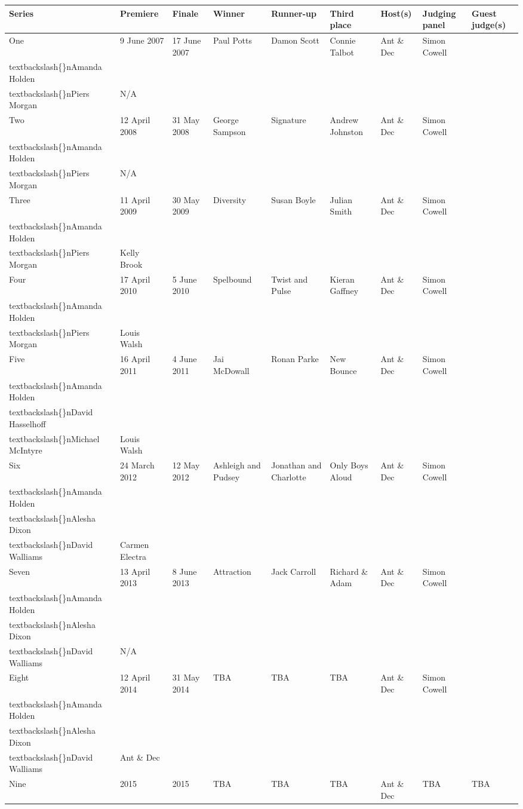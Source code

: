 \documentclass{article}
\begin{document}
\begin{tabular}{lllllllll}
\toprule
Series & Premiere & Finale & Winner & Runner-up & Third place & Host(s) & Judging panel & Guest judge(s) \\
\midrule
One & 9 June 2007 & 17 June 2007 & Paul Potts & Damon Scott & Connie Talbot & Ant \& Dec & Simon Cowell\\textbackslash\{\}nAmanda Holden\\textbackslash\{\}nPiers Morgan & N/A \\
Two & 12 April 2008 & 31 May 2008 & George Sampson & Signature & Andrew Johnston & Ant \& Dec & Simon Cowell\\textbackslash\{\}nAmanda Holden\\textbackslash\{\}nPiers Morgan & N/A \\
Three & 11 April 2009 & 30 May 2009 & Diversity & Susan Boyle & Julian Smith & Ant \& Dec & Simon Cowell\\textbackslash\{\}nAmanda Holden\\textbackslash\{\}nPiers Morgan & Kelly Brook \\
Four & 17 April 2010 & 5 June 2010 & Spelbound & Twist and Pulse & Kieran Gaffney & Ant \& Dec & Simon Cowell\\textbackslash\{\}nAmanda Holden\\textbackslash\{\}nPiers Morgan & Louis Walsh \\
Five & 16 April 2011 & 4 June 2011 & Jai McDowall & Ronan Parke & New Bounce & Ant \& Dec & Simon Cowell\\textbackslash\{\}nAmanda Holden\\textbackslash\{\}nDavid Hasselhoff\\textbackslash\{\}nMichael McIntyre & Louis Walsh \\
Six & 24 March 2012 & 12 May 2012 & Ashleigh and Pudsey & Jonathan and Charlotte & Only Boys Aloud & Ant \& Dec & Simon Cowell\\textbackslash\{\}nAmanda Holden\\textbackslash\{\}nAlesha Dixon\\textbackslash\{\}nDavid Walliams & Carmen Electra \\
Seven & 13 April 2013 & 8 June 2013 & Attraction & Jack Carroll & Richard \& Adam & Ant \& Dec & Simon Cowell\\textbackslash\{\}nAmanda Holden\\textbackslash\{\}nAlesha Dixon\\textbackslash\{\}nDavid Walliams & N/A \\
Eight & 12 April 2014 & 31 May 2014 & TBA & TBA & TBA & Ant \& Dec & Simon Cowell\\textbackslash\{\}nAmanda Holden\\textbackslash\{\}nAlesha Dixon\\textbackslash\{\}nDavid Walliams & Ant \& Dec \\
Nine & 2015 & 2015 & TBA & TBA & TBA & Ant \& Dec & TBA & TBA \\
\bottomrule
\end{tabular}
\end{document}
